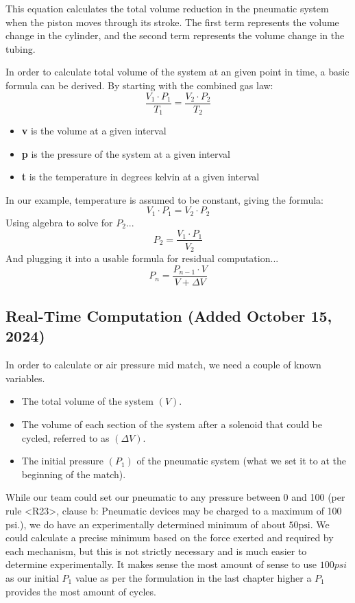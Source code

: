 This equation calculates the total volume reduction in the pneumatic system when the piston moves through its stroke. The first term represents the volume change in the cylinder, and the second term represents the volume change in the tubing.

In order to calculate total volume of the system at an given point in time, a basic formula can be derived. By starting with the combined gas law: \[\frac{V_1\cdot P_1}{T_1} = \frac{V_2\cdot P_2}{T_2}\]
\begin{itemize}
    \item \textbf{v} is the volume at a given interval
    \item \textbf{p} is the pressure of the system at a given interval
    \item \textbf{t} is the temperature in degrees kelvin at a given interval
\end{itemize}
In our example, temperature is assumed to be constant, giving the formula: \[V_1\cdot P_1 = V_2\cdot P_2\]
Using algebra to solve for $P_2$... \[P_2 = \frac{V_1\cdot P_1}{V_2}\]
And plugging it into a usable formula for residual computation... \[P_n = \frac{P_{n-1}\cdot V}{V + \Delta V}\]

\subsection*{Real-Time Computation (Added October 15, 2024)}

In order to calculate or air pressure mid match, we need a couple of known variables. 
\begin{itemize}
    \item The total volume of the system $(V)$.
    \item The volume of each section of the system after a solenoid that could be cycled, referred to as $(\Delta V)$.
    \item The initial pressure $(P_1)$ of the pneumatic system (what we set it to at the beginning of the match).
\end{itemize}
While our team could set our pneumatic to any pressure between 0 and 100 (per rule \textless R23\textgreater, clause b: Pneumatic devices may be charged to a maximum of 100 psi.), we do have an experimentally determined minimum of about \(50\text{psi}\). We could calculate a precise minimum based on the force exerted and required by each mechanism, but this is not strictly necessary and is much easier to determine experimentally. It makes sense the most amount of sense to use $100psi$ as our initial \(P_1\) value as per the formulation in the last chapter higher a \(P_1\) provides the most amount of cycles.

